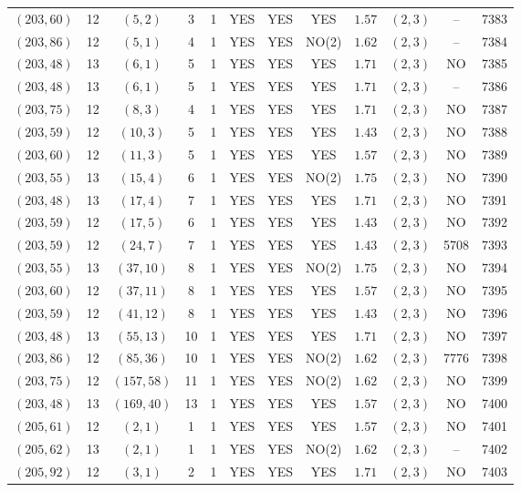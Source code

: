 \begin{longtable}{|c|c|c|c|c|c|c|c|c|c|c|c|}
$(203,60)$ & 12 & $(5,2)$ & 3 & 1 & YES & YES & YES & $1.57$ & $(2,3)$ & -- & 7383\\
$(203,86)$ & 12 & $(5,1)$ & 4 & 1 & YES & YES & NO(2) & $1.62$ & $(2,3)$ & -- & 7384\\
$(203,48)$ & 13 & $(6,1)$ & 5 & 1 & YES & YES & YES & $1.71$ & $(2,3)$ & NO & 7385\\
$(203,48)$ & 13 & $(6,1)$ & 5 & 1 & YES & YES & YES & $1.71$ & $(2,3)$ & -- & 7386\\
$(203,75)$ & 12 & $(8,3)$ & 4 & 1 & YES & YES & YES & $1.71$ & $(2,3)$ & NO & 7387\\
$(203,59)$ & 12 & $(10,3)$ & 5 & 1 & YES & YES & YES & $1.43$ & $(2,3)$ & NO & 7388\\
$(203,60)$ & 12 & $(11,3)$ & 5 & 1 & YES & YES & YES & $1.57$ & $(2,3)$ & NO & 7389\\
$(203,55)$ & 13 & $(15,4)$ & 6 & 1 & YES & YES & NO(2) & $1.75$ & $(2,3)$ & NO & 7390\\
$(203,48)$ & 13 & $(17,4)$ & 7 & 1 & YES & YES & YES & $1.71$ & $(2,3)$ & NO & 7391\\
$(203,59)$ & 12 & $(17,5)$ & 6 & 1 & YES & YES & YES & $1.43$ & $(2,3)$ & NO & 7392\\
$(203,59)$ & 12 & $(24,7)$ & 7 & 1 & YES & YES & YES & $1.43$ & $(2,3)$ & 5708 & 7393\\
$(203,55)$ & 13 & $(37,10)$ & 8 & 1 & YES & YES & NO(2) & $1.75$ & $(2,3)$ & NO & 7394\\
$(203,60)$ & 12 & $(37,11)$ & 8 & 1 & YES & YES & YES & $1.57$ & $(2,3)$ & NO & 7395\\
$(203,59)$ & 12 & $(41,12)$ & 8 & 1 & YES & YES & YES & $1.43$ & $(2,3)$ & NO & 7396\\
$(203,48)$ & 13 & $(55,13)$ & 10 & 1 & YES & YES & YES & $1.71$ & $(2,3)$ & NO & 7397\\
$(203,86)$ & 12 & $(85,36)$ & 10 & 1 & YES & YES & NO(2) & $1.62$ & $(2,3)$ & 7776 & 7398\\
$(203,75)$ & 12 & $(157,58)$ & 11 & 1 & YES & YES & NO(2) & $1.62$ & $(2,3)$ & NO & 7399\\
$(203,48)$ & 13 & $(169,40)$ & 13 & 1 & YES & YES & YES & $1.57$ & $(2,3)$ & NO & 7400\\
$(205,61)$ & 12 & $(2,1)$ & 1 & 1 & YES & YES & YES & $1.57$ & $(2,3)$ & NO & 7401\\
$(205,62)$ & 13 & $(2,1)$ & 1 & 1 & YES & YES & NO(2) & $1.62$ & $(2,3)$ & -- & 7402\\
$(205,92)$ & 12 & $(3,1)$ & 2 & 1 & YES & YES & YES & $1.71$ & $(2,3)$ & NO & 7403\\

\end{longtable}
